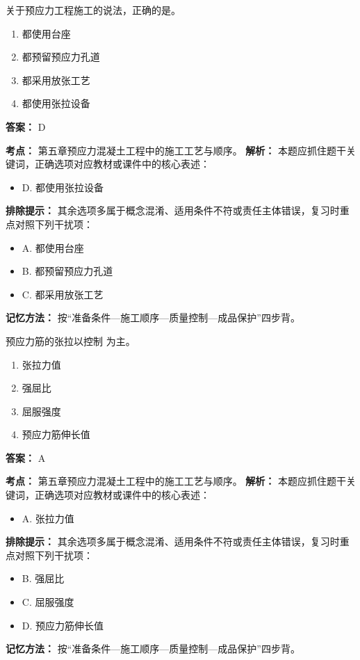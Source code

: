 \documentclass[UTF8,fontset=fandol,11pt]{ctexart}
\begin{document}
\vspace{0.2em}

\begin{quizbox}[title={第 3 题}]
关于预应力工程施工的说法，正确的是。\\
\begin{enumerate}[label=\Alph*.]
\item 都使用台座
\item 都预留预应力孔道
\item 都采用放张工艺
\item 都使用张拉设备
\end{enumerate}
\textbf{答案：} D
\vspace{0.25em}
\begin{answerbox}[title={考点解析}]
\textbf{考点：} 第五章预应力混凝土工程中的施工工艺与顺序。
\textbf{解析：} 本题应抓住题干关键词，正确选项对应教材或课件中的核心表述：
\begin{itemize}
\item D. 都使用张拉设备
\end{itemize}
\textbf{排除提示：} 其余选项多属于概念混淆、适用条件不符或责任主体错误，复习时重点对照下列干扰项：
\begin{itemize}
\item A. 都使用台座
\item B. 都预留预应力孔道
\item C. 都采用放张工艺
\end{itemize}
\textbf{记忆方法：} 按“准备条件—施工顺序—质量控制—成品保护”四步背。
\end{answerbox}
\end{quizbox}

\vspace{0.2em}

\begin{quizbox}[title={第 4 题}]
预应力筋的张拉以控制 为主。\\
\begin{enumerate}[label=\Alph*.]
\item 张拉力值
\item 强屈比
\item 屈服强度
\item 预应力筋伸长值
\end{enumerate}
\textbf{答案：} A
\vspace{0.25em}
\begin{answerbox}[title={考点解析}]
\textbf{考点：} 第五章预应力混凝土工程中的施工工艺与顺序。
\textbf{解析：} 本题应抓住题干关键词，正确选项对应教材或课件中的核心表述：
\begin{itemize}
\item A. 张拉力值
\end{itemize}
\textbf{排除提示：} 其余选项多属于概念混淆、适用条件不符或责任主体错误，复习时重点对照下列干扰项：
\begin{itemize}
\item B. 强屈比
\item C. 屈服强度
\item D. 预应力筋伸长值
\end{itemize}
\textbf{记忆方法：} 按“准备条件—施工顺序—质量控制—成品保护”四步背。
\end{answerbox}
\end{quizbox}
\end{document}
